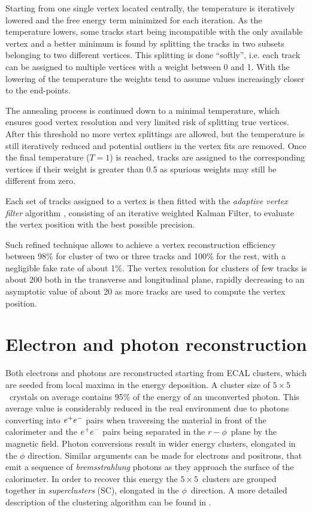 Starting from one single vertex located centrally, the temperature is iteratively lowered and the free energy term minimized for each iteration. As the temperature lowers, some tracks start being incompatible with the only available vertex and a better minimum is found by splitting the tracks in two subsets belonging to two different vertices. This splitting is done ``softly'', i.e. each track can be assigned to multiple vertices with a weight between 0 and 1. With the lowering of the temperature the weights tend to assume values increasingly closer to the end-points.

The annealing process is continued down to a minimal temperature, which ensures good vertex resolution and very limited risk of splitting true vertices. After this threshold no more vertex splittings are allowed, but the temperature is still iteratively reduced and potential outliers in the vertex fits are removed. Once the final temperature ($T=1$) is reached, tracks are assigned to the corresponding vertices if their weight is greater than 0.5 as spurious weights may still be different from zero. 

Each set of tracks assigned to a vertex is then fitted with the \emph{adaptive vertex filter} algorithm \cite{CMS_NOTE_2007-008}, consisting of an iterative weighted Kalman Filter, to evaluate the vertex position with the best possible precision.

Such refined technique allows to achieve a vertex reconstruction efficiency between 98\% for cluster  of two or three tracks and 100\% for the rest, with a negligible fake rate of about 1\%. The vertex resolution for clusters of few tracks is about 200 \um both in the transverse and longitudinal plane, rapidly decreasing to an asymptotic value of about 20 \um as more tracks are used to compute the vertex position.

\section{Electron and photon reconstruction}

Both electrons and photons are reconstructed starting from ECAL clusters, which are seeded from local maxima in the energy deposition. A cluster size of $5\times5$\ crystals on average contains 95\% of the energy of an unconverted photon. This average value is considerably reduced in the real environment due to photons converting into $e^{+}e^{-}$ pairs when traversing the material in front of the calorimeter and the $e^{+}e^{-}$ pairs being separated in the $r-\phi$\ plane by the magnetic field. Photon conversions result in wider energy clusters, elongated in the $\phi$ direction. Similar arguments can be made for electrons and positrons, that emit a sequence of \emph{bremsstrahlung} photons as they approach the surface of the calorimeter. In order to recover this energy the $5\times5$\ clusters are grouped together in \emph{superclusters} (SC), elongated in the $\phi$\ direction. A more detailed description of the clustering algorithm can be found in \cite{CMS:2006tdr1}.

